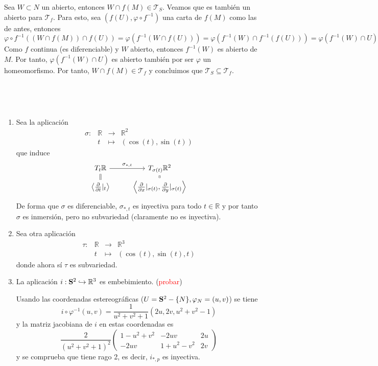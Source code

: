 \begin{dem}
Sea $W\subset N$ un abierto, entonces $W \cap f(M) \in \mathcal{T}_S$. Veamos que es también un abierto para $\mathcal{T}_f$. Para esto, sea $(f(U),\varphi\circ f^{-1})$ una carta de $f(M)$ como las de antes, entonces 
$$\varphi\circ f^{-1}((W\cap f(M))\cap f(U)) = \varphi(f^{-1}(W\cap f(U))) = \varphi(f^{-1}(W) \cap f^{-1}(f(U))) = \varphi(f^{-1}(W) \cap U)$$
Como $f$ continua (es diferenciable) y $W$ abierto, entonces $f^{-1}(W)$ es abierto de $M$. Por tanto, $\varphi(f^{-1}(W) \cap U)$ es abierto también por ser $\varphi$ un homeomorfismo. Por tanto, $W \cap f(M) \in \mathcal{T}_f$ y concluimos que $\mathcal{T}_S \subseteq \mathcal{T}_f$.
\end{dem} 

\, \\

\begin{ejem} \,
\begin{enumerate}
    \item Sea la aplicación $$\begin{array}{rrcl}
     \sigma: & \mathbb R &\longrightarrow & \mathbb R^2  \\
     & t &\longmapsto & (\cos(t), \sin(t)) 
\end{array}$$que induce $$\begin{tikzcd}
T_t\mathbb{R} \arrow{r}{\sigma_{*,t}} & T_{\sigma(t)}\mathbb{R}^2\\[-5mm]
\left\langle \frac{\partial}{\partial t}|_t\right\rangle \arrow[equals]{u} & \arrow[equals]{u} \left\langle\frac{\partial}{\partial x}|_{\sigma(t)},\frac{\partial}{\partial y}|_{\sigma(t)}\right\rangle \end{tikzcd}$$
De forma que $\sigma$ es diferenciable, $\sigma_{*,t}$ es inyectiva para todo $t\in \mathbb{R}$ y por tanto $\sigma$ es inmersión, pero no subvariedad (claramente no es inyectiva).
\item Sea otra aplicaci\'on
$$\begin{array}{rrcl}
     \tau: & \mathbb R &\longrightarrow & \mathbb R^3  \\
     & t &\longmapsto & (\cos(t), \sin(t), t) 
\end{array}$$
donde ahora s\'i $\tau$ es subvariedad.
\item La aplicaci\'on $i : \bold S^2 \hookrightarrow \mathbb R^3$ es embebimiento. (\textcolor{red}{probar})

Usando las coordenadas estereogr\'aficas ($U=\bold S^2-\{N\}, \varphi_N = (u,v)$) se tiene
$$i \circ \varphi^{-1} (u,v) = \dfrac{1}{u^2+v^2+1}(2u,2v,u^2+v^2-1)$$
y la matriz jacobiana de $i$ en estas coordenadas es
$$\dfrac{2}{(u^2+v^2+1)^2} \begin{pmatrix}
    1-u^2+v^2 & -2uv & 2u \\ -2uv & 1+u^2-v^2 & 2v
\end{pmatrix}$$
y se comprueba que tiene rago 2, es decir, $i_{*,p}$ es inyectiva. 


\end{enumerate}
\end{ejem}
